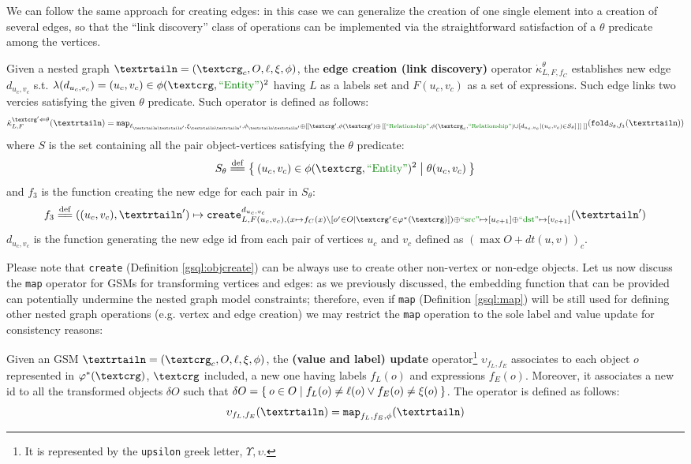 We can follow the same approach for creating edges: in this case we can generalize the creation of one single element into a creation of several edges, so that the ``link discovery'' class of operations can be implemented \cite{markus} via the straightforward satisfaction of a $\theta$ predicate among the vertices.

\begin{definition}
	Given a nested graph $\nested=(\ngraph_c,O,\ell,\xi,\phi)$, the \textbf{edge creation (link discovery)} operator $\dot\kappa^\theta_{L,F,f_C}$ establishes new edge  $d_{u_c,v_c}$ s.t. $\lambda(d_{u_c,v_c})=(u_c,v_c)\in\phi(\ngraph,\ONTA)^2$ having $L$ as a labels set and $F(u_c,v_c)$ as a set of expressions. Such edge links two vercies satisfying the given $\theta$ predicate. Such operator is defined as follows:
	\[\dot\kappa^{\ngraph'\Leftarrow\theta}_{L,F}(\nested)=\texttt{map}_{\ell_{\nested\nested'},\xi_{\nested\nested'},\phi_{\nested\nested'}\oplus [[\ngraph', \phi(\ngraph')\oplus\,[[\RELA, \phi(\ngraph_c,\RELA)\cup[d_{u_c,v_c}|(u_c,v_c)\in S_\theta]\,]] \;]]}(\texttt{fold}_{S_\theta,f_3}(\nested))\]
	where $S$ is the set containing all the pair object-vertices satisfying the $\theta$ predicate:
	\[S_\theta\eqdef\Set{(u_c,v_c)\in\phi(\ngraph,\ONTA)^2|\theta(u_c,v_c)}\]
	and $f_3$ is the function creating the new edge for each pair in $S_\theta$:
	\[f_3\eqdef((u_c,v_c),\nested')\mapsto\texttt{create}^{d_{u_c,v_c}}_{L,F(u_c,v_c), (x\mapsto f_C(x)\backslash[o'\in O|\ngraph'\in\varphi^*(\ngraph)])\oplus\SRC\mapsto [u_{c+1}]\oplus \DST\mapsto [v_{c+1}]}(\nested')\]
	$d_{u_c,v_c}$ is the function generating the new edge id from each pair of vertices $u_c$ and $v_c$ defined as $(\max O+dt(u,v))_{c}$.  
\end{definition}

Please note that  \texttt{create} (Definition \vref{gsql:objcreate}) can be always use to create other non-vertex or non-edge objects. 
Let us now discuss the \texttt{map} operator for GSMs  for transforming vertices and edges: as we previously discussed, the embedding function that can be provided can potentially undermine the nested graph model constraints; therefore, even if \texttt{map} (Definition \vref{gsql:map}) will be still used for defining other nested graph operations (e.g. vertex and edge creation) we may restrict the \texttt{map} operation to the sole label and value update for consistency reasons:

\begin{definition}	
	Given an GSM $\fullnested[][\ngraph_{c}]$, the \textbf{(value and label) update} operator\footnote{It is represented by the \texttt{upsilon} greek letter, $\Upsilon,\upsilon$.} $\upsilon_{f_L,f_E}$ associates to each object $o$ represented in $\varphi^*(\ngraph)$, $\ngraph$ included, a new one having labels $f_L(o)$ and expressions $f_E(o)$. Moreover, it associates a new id to all the transformed objects $\delta O$ such that $\delta O=\Set{o\in O|f_L(o)\neq \ell(o)\vee f_E(o)\neq \xi(o)}$. The operator is defined as follows:
	\[\upsilon_{f_L,f_E}(\nested)=\texttt{map}_{f_L,f_E,\phi}(\nested)\]
\end{definition} 

